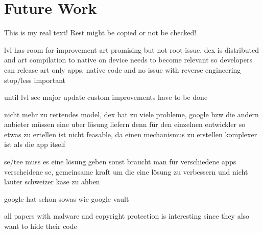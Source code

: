 \section{Future Work}\label{section:conclusion-future}
This is my real text! Rest might be copied or not be checked!


%
lvl has room for improvement
art promising but not root issue, dex is distributed and art compilation to native on device
needs to become relevant so developers can release art only apps, native code and no issue with reverse engineering stop/less important

until lvl see major update custom improvements have to be done
\cite{munteanLicense}
%

nicht mehr zu rettendes model, dex hat zu viele probleme, google bzw die andern anbieter müssen eine uber lösung liefern denn für den einzelnen entwickler so etwas zu ertellen ist nicht feasable, da einen mechanismus zu erstellen komplexer ist als die app itself

se/tee muss es eine lösung geben sonst braucht man für verschiedene apps verscheidene se, gemeinsame kraft um die eine lösung zu verbessern und nicht lauter schweizer käse zu ahben

google hat schon sowas wie google vault

all papers with malware and copyright protection is interesting since they also want to hide their code
